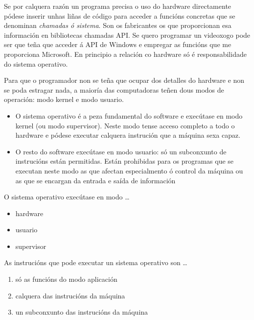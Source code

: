 Se por calquera razón un programa precisa o uso do hardware directamente pódese inserir unhas liñas de código para acceder a funcións concretas que se denominan  \textit{chamadas ó sistema}. Son os fabricantes os que proporcionan esa información en bibliotecas chamadas API. Se quero programar un videoxogo pode ser que teña que acceder á API de Windows e empregar as funcións que me proporciona Microsoft. En principio a relación co hardware só é responsabilidade do sistema operativo.

Para que o programador non se teña que ocupar dos detalles do hardware e non se poda estragar nada,  a maioría das computadoras teñen dous modos de operación: modo kernel e modo usuario.


\begin{itemize}
\item 
O sistema operativo é a peza fundamental do software e  execútase en modo kernel (ou modo supervisor). Neste modo tense acceso completo a todo o hardware e pódese executar calquera instrución que a máquina sexa capaz.
\item O resto do software  execútase en modo usuario: só un subconxunto de instrucións están permitidas. Están prohibidas para os programas que se executan neste modo as que afectan especialmento ó control da máquina ou as que se encargan da entrada e saída de información 
\end{itemize}


\begin{diapo}\begin{frame}{O sistema operativo execútase en modo \dots}
\begin{itemize}
\item hardware\pause
\item usuario \pause
\item supervisor 
\end{itemize}
\end{frame}\end{diapo} 
\begin{diapo}\begin{frame}{As instrucións que pode executar un sistema operativo son \dots}
\begin{enumerate}
\item só as funcións do modo aplicación \pause
\item calquera das instrucións da máquina \pause
\item un subconxunto das instrucións da máquina
\end{enumerate} 
\end{frame} 
\end{diapo} 


